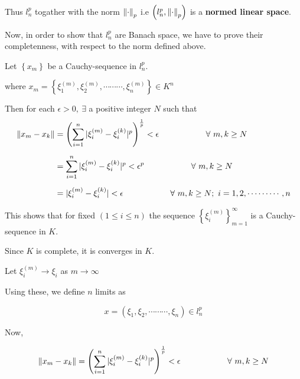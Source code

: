 \documentclass[a4paper,12pt]{article}
\begin{document}
    Thus $l^p_{n}$ togather with the norm $\norm{\cdot}_p$ i.e $\left(l^p_{n}, \norm{\cdot}_p\right)$ is a {\bf normed linear space}.

    \pagebreak

    \vspace*{0.5cm}

    Now, in order to show that $l^p_{n}$ are Banach space, we have to prove their completenness, with respect to the norm defined above.

    \vspace*{0.2cm}

    Let $\left\{x_m\right\}$ be a Cauchy-sequence in $l_n^{p}$.

    where $x_m = \left\{\xi_1^{(m)}, \xi_2^{(m)}, \cdots \cdots \cdots, \xi_n^{(m)}\right\} \in K^n$

    Then for each $\epsilon > 0,\ \exists$ a positive integer $N$ such that
    \begin{equation*}
        \begin{split}
            \norm{x_m -x_k} & = \left(\sum_{i=1}^{n}|\xi_i^{(m)} - \xi_i^{(k)}|^p\right)^\frac{1}{p} < \epsilon \hspace*{2cm} \forall\ m,k\geq N\\[2mm]
            & = \sum_{i=1}^{n} |\xi_i^{(m)} - \xi_i^{(k)}|^p < \epsilon^p \hspace*{2cm} \forall\ m,k\geq N \\[2mm]
            & = |\xi_i^{(m)} - \xi_i^{(k)}| < \epsilon \hspace*{2cm} \forall\ m,k \geq N ;\ i = 1,2,\cdots \cdots \cdots, n
        \end{split}
    \end{equation*}

    This shows that for fixed $(1\leq i \leq n)$ the sequence $\left\{\xi_i^{(m)}\right\}_{m=1}^{\infty}$ is a Cauchy-sequence in $K$.

    Since $K$ is complete, it is converges in $K$.

    Let $\xi_i^{(m)}\to \xi_i$ as $m\to \infty$

    Using these, we define $n$ limits as

    \[x = \left(\xi_1,\xi_2, \cdots \cdots \cdots , \xi_n\right)\in l_n^{p}\]

    Now,

    \[\norm{x_m -x_k}  = \left(\sum_{i=1}^{n}|\xi_i^{(m)} - \xi_i^{(k)}|^p\right)^\frac{1}{p} < \epsilon \hspace*{2cm} \forall\ m,k\geq N\]
\end{document}
